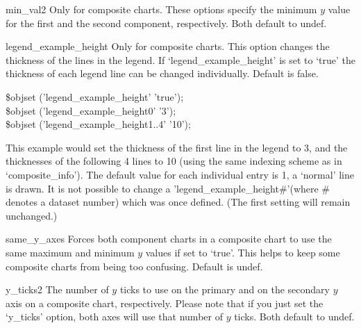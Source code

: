 \begin{AttrDecl}{min\_val2}
Only for composite charts. These options specify the minimum $y$ value
for the first and the second component, respectively. Both default to
undef.
\end{AttrDecl}

\begin{AttrDecl}{legend\_example\_height}
Only for composite charts. This option changes the thickness of the
lines in the legend. If `legend\_example\_height' is set to `true' the
thickness of each legend line can be changed individually. Default is
false. \Eg
\begin{SmallExample}
\$obj\deref set ('legend\_example\_height'     \fatcomma 'true');\\
\$obj\deref set ('legend\_example\_height0'    \fatcomma '3');\\
\$obj\deref set ('legend\_example\_height1..4' \fatcomma '10');
\end{SmallExample}

This example would set the thickness of the first line in the legend to
3, and the thicknesses of the following 4 lines to 10 (using the same
indexing scheme as in `composite\_info'). The default value for each
individual entry is 1, \ie a `normal' line is drawn. It is not possible
to change a 'legend\_example\_height\#'(where \# denotes a dataset
number) which was once defined. (The first setting will remain
unchanged.)
\end{AttrDecl}

\begin{AttrDecl}{same\_y\_axes}
Forces both component charts in a composite chart to use the same
maximum and minimum $y$ values if set to `true'. This helps to keep
some composite charts from being too confusing. Default is undef.
\end{AttrDecl}

\begin{AttrDecl}{y\_ticks2}
The number of $y$ ticks to use on the primary and on the secondary $y$
axis on a composite chart, respectively. Please note that if you just
set the `y\_ticks' option, both axes will use that number of $y$ ticks.
Both default to undef.
\end{AttrDecl}
